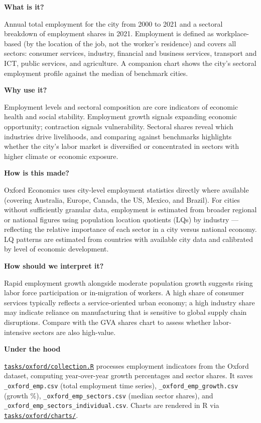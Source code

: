 \documentclass[
  letterpaper,
  DIV=11,
  numbers=noendperiod]{scrreprt}
\begin{document}
\textbf{What is it?}

Annual total employment for the city from 2000 to 2021 and a sectoral
breakdown of employment shares in 2021. Employment is defined as
workplace-based (by the location of the job, not the worker's residence)
and covers all sectors: consumer services, industry, financial and
business services, transport and ICT, public services, and agriculture.
A companion chart shows the city's sectoral employment profile against
the median of benchmark cities.

\textbf{Why use it?}

Employment levels and sectoral composition are core indicators of
economic health and social stability. Employment growth signals
expanding economic opportunity; contraction signals vulnerability.
Sectoral shares reveal which industries drive livelihoods, and comparing
against benchmarks highlights whether the city's labor market is
diversified or concentrated in sectors with higher climate or economic
exposure.

\textbf{How is this made?}

Oxford Economics uses city-level employment statistics directly where
available (covering Australia, Europe, Canada, the US, Mexico, and
Brazil). For cities without sufficiently granular data, employment is
estimated from broader regional or national figures using population
location quotients (LQs) by industry --- reflecting the relative
importance of each sector in a city versus national economy. LQ patterns
are estimated from countries with available city data and calibrated by
level of economic development.

\textbf{How should we interpret it?}

Rapid employment growth alongside moderate population growth suggests
rising labor force participation or in-migration of workers. A high
share of consumer services typically reflects a service-oriented urban
economy; a high industry share may indicate reliance on manufacturing
that is sensitive to global supply chain disruptions. Compare with the
GVA shares chart to assess whether labor-intensive sectors are also
high-value.

\textbf{Under the hood}

\href{../tasks/oxford/collection.R}{\texttt{tasks/oxford/collection.R}}
processes employment indicators from the Oxford dataset, computing
year-over-year growth percentages and sector shares. It saves
\texttt{\_oxford\_emp.csv} (total employment time series),
\texttt{\_oxford\_emp\_growth.csv} (growth \%),
\texttt{\_oxford\_emp\_sectors.csv} (median sector shares), and
\texttt{\_oxford\_emp\_sectors\_individual.csv}. Charts are rendered in
R via \href{../tasks/oxford/charts/}{\texttt{tasks/oxford/charts/}}.
\end{document}
